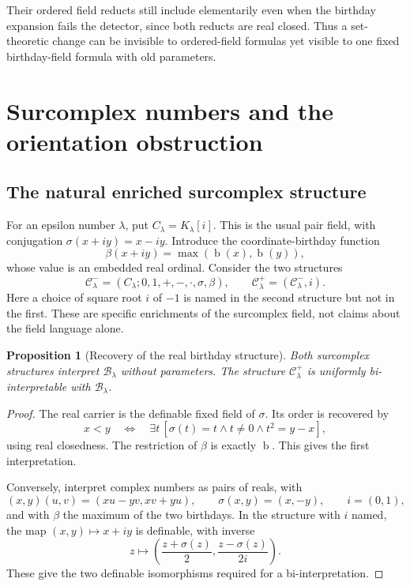 \documentclass[11pt,letterpaper]{article}
\newtheorem{proposition}[theorem]{Proposition}
\theoremstyle{definition}
\theoremstyle{remark}
\newcommand{\bd}{\operatorname{b}}
\newcommand{\B}{\mathcal B}
\newcommand{\C}{\mathcal C}
\begin{document}
Their ordered field reducts still include elementarily even when the
birthday expansion fails the detector, since both reducts are real closed.
Thus a set-theoretic change can be invisible to ordered-field formulas yet
visible to one fixed birthday-field formula with old parameters.

\section{Surcomplex numbers and the orientation obstruction}
\label{sec:surcomplex}

\subsection{The natural enriched surcomplex structure}

For an epsilon number $\lambda$, put $C_\lambda=K_\lambda[i]$. This is the
usual pair field, with conjugation $\sigma(x+iy)=x-iy$. Introduce the
coordinate-birthday function
\[
 \beta(x+iy)=\max(\bd(x),\bd(y)),
\]
whose value is an embedded real ordinal. Consider the two structures
\[
 \C_\lambda^-=(C_\lambda;0,1,+,-,\cdot,\sigma,\beta),
 \qquad
 \C_\lambda^+=(\C_\lambda^-,i).
\]
Here a choice of square root $i$ of $-1$ is named in the second structure
but not in the first. These are specific enrichments of the surcomplex
field, not claims about the field language alone.

\begin{proposition}[Recovery of the real birthday structure]
\label{prop:real-recovery}
Both surcomplex structures interpret $\B_\lambda$ without parameters.
The structure $\C_\lambda^+$ is uniformly bi-interpretable with
$\B_\lambda$.
\end{proposition}
\begin{proof}
The real carrier is the definable fixed field of $\sigma$. Its order is
recovered by
\[
 x<y\quad\Longleftrightarrow\quad
 \exists t\,[\sigma(t)=t\land t\ne0\land t^2=y-x],
\]
using real closedness. The restriction of $\beta$ is exactly $\bd$.
This gives the first interpretation.

Conversely, interpret complex numbers as pairs of reals, with
\[
 (x,y)(u,v)=(xu-yv,xv+yu),\qquad
 \sigma(x,y)=(x,-y),\qquad i=(0,1),
\]
and with $\beta$ the maximum of the two birthdays. In the structure with
$i$ named, the map $(x,y)\mapsto x+iy$ is definable, with inverse
\[
 z\longmapsto
 \left(\frac{z+\sigma(z)}2,
       \frac{z-\sigma(z)}{2i}\right).
\]
These give the two definable isomorphisms required for a bi-interpretation.
\end{proof}
\end{document}
